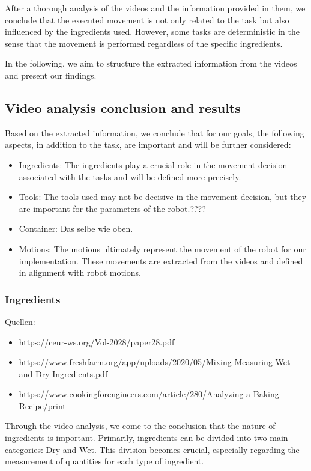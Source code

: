 After a thorough analysis of the videos and the information provided in them, we conclude that the executed movement is not only related to the task but also influenced by the ingredients used. However, some tasks are deterministic in the sense that the movement is performed regardless of the specific ingredients.

In the following, we aim to structure the extracted information from the videos and present our findings.

\subsection*{Video analysis conclusion and results}

Based on the extracted information, we conclude that for our goals, the following aspects, in addition to the task, are important and will be further considered:
\begin{itemize}
  \item Ingredients: The ingredients play a crucial role in the movement decision associated with the tasks and will be defined more precisely.
  \item Tools: The tools used may not be decisive in the movement decision, but they are important for the parameters of the robot.????
  \item Container: Das selbe wie oben.
  \item Motions: The motions ultimately represent the movement of the robot for our implementation. These movements are extracted from the videos and defined in alignment with robot motions.
\end{itemize}

\subsubsection*{Ingredients}
Quellen:
\begin{itemize}
  \item https://ceur-ws.org/Vol-2028/paper28.pdf
  \item https://www.freshfarm.org/app/uploads/2020/05/Mixing-Measuring-Wet-and-Dry-Ingredients.pdf
  \item https://www.cookingforengineers.com/article/280/Analyzing-a-Baking-Recipe/print
\end{itemize}
Through the video analysis, we come to the conclusion that the nature of ingredients is important. Primarily, ingredients can be divided into two main categories: Dry and Wet. This division becomes crucial, especially regarding the measurement of quantities for each type of ingredient.

